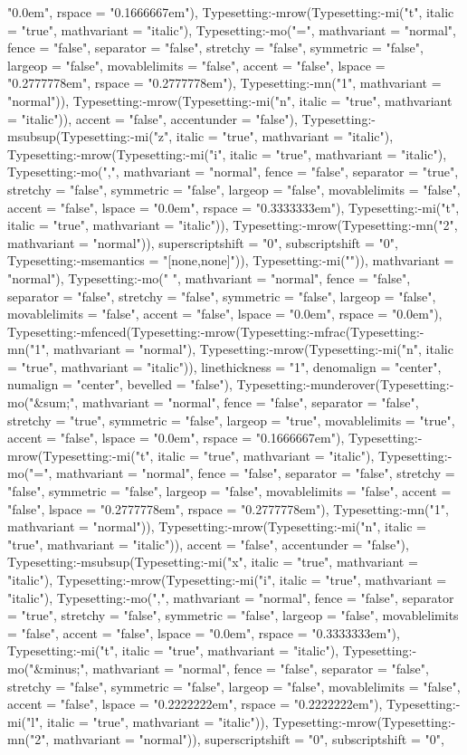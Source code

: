 \documentclass{article}
\begin{document}
\begin{Maple Normal}
{\begin{Maple Normal}
{"0.0em", rspace = "0.1666667em"), Typesetting:-mrow(Typesetting:-mi("t", italic = "true", mathvariant = "italic"), Typesetting:-mo("=", mathvariant = "normal", fence = "false", separator = "false", stretchy = "false", symmetric = "false", largeop = "false", movablelimits = "false", accent = "false", lspace = "0.2777778em", rspace = "0.2777778em"), Typesetting:-mn("1", mathvariant = "normal")), Typesetting:-mrow(Typesetting:-mi("n", italic = "true", mathvariant = "italic")), accent = "false", accentunder = "false"), Typesetting:-msubsup(Typesetting:-mi("z", italic = "true", mathvariant = "italic"), Typesetting:-mrow(Typesetting:-mi("i", italic = "true", mathvariant = "italic"), Typesetting:-mo(",", mathvariant = "normal", fence = "false", separator = "true", stretchy = "false", symmetric = "false", largeop = "false", movablelimits = "false", accent = "false", lspace = "0.0em", rspace = "0.3333333em"), Typesetting:-mi("t", italic = "true", mathvariant = "italic")), Typesetting:-mrow(Typesetting:-mn("2", mathvariant = "normal")), superscriptshift = "0", subscriptshift = "0", Typesetting:-msemantics = "[none,none]")), Typesetting:-mi("")), mathvariant = "normal"), Typesetting:-mo(" ", mathvariant = "normal", fence = "false", separator = "false", stretchy = "false", symmetric = "false", largeop = "false", movablelimits = "false", accent = "false", lspace = "0.0em", rspace = "0.0em"), Typesetting:-mfenced(Typesetting:-mrow(Typesetting:-mfrac(Typesetting:-mn("1", mathvariant = "normal"), Typesetting:-mrow(Typesetting:-mi("n", italic = "true", mathvariant = "italic")), linethickness = "1", denomalign = "center", numalign = "center", bevelled = "false"), Typesetting:-munderover(Typesetting:-mo("&sum;", mathvariant = "normal", fence = "false", separator = "false", stretchy = "true", symmetric = "false", largeop = "true", movablelimits = "true", accent = "false", lspace = "0.0em", rspace = "0.1666667em"), Typesetting:-mrow(Typesetting:-mi("t", italic = "true", mathvariant = "italic"), Typesetting:-mo("=", mathvariant = "normal", fence = "false", separator = "false", stretchy = "false", symmetric = "false", largeop = "false", movablelimits = "false", accent = "false", lspace = "0.2777778em", rspace = "0.2777778em"), Typesetting:-mn("1", mathvariant = "normal")), Typesetting:-mrow(Typesetting:-mi("n", italic = "true", mathvariant = "italic")), accent = "false", accentunder = "false"), Typesetting:-msubsup(Typesetting:-mi("x", italic = "true", mathvariant = "italic"), Typesetting:-mrow(Typesetting:-mi("i", italic = "true", mathvariant = "italic"), Typesetting:-mo(",", mathvariant = "normal", fence = "false", separator = "true", stretchy = "false", symmetric = "false", largeop = "false", movablelimits = "false", accent = "false", lspace = "0.0em", rspace = "0.3333333em"), Typesetting:-mi("t", italic = "true", mathvariant = "italic"), Typesetting:-mo("&minus;", mathvariant = "normal", fence = "false", separator = "false", stretchy = "false", symmetric = "false", largeop = "false", movablelimits = "false", accent = "false", lspace = "0.2222222em", rspace = "0.2222222em"), Typesetting:-mi("l", italic = "true", mathvariant = "italic")), Typesetting:-mrow(Typesetting:-mn("2", mathvariant = "normal")), superscriptshift = "0", subscriptshift = "0", }
\end{Maple Normal}}
\end{Maple Normal}
\end{document}
